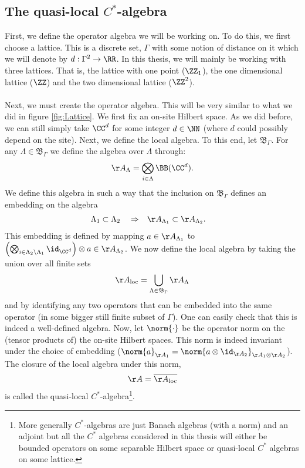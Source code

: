 \subsection{The quasi-local $C^*$-algebra}
First, we define the operator algebra we will be working on. To do this, we first choose a lattice. This is a discrete set, $\Gamma$ with some notion of distance on it which we will denote by $d:\Gamma^2\rightarrow \RR$. In this thesis, we will mainly be working with three lattices. That is, the lattice with one point ($\ZZ_1$), the one dimensional lattice ($\ZZ$) and the two dimensional lattice ($\ZZ^2$).\\\\
Next, we must create the operator algebra. This will be very similar to what we did in figure \ref{fig:Lattice}. We first fix an on-site Hilbert space. As we did before, we can still simply take $\CC^d$ for some integer $d\in\NN$ (where $d$ could possibly depend on the site). Next, we define the local algebra. To this end, let $\mathfrak{B}_{\Gamma}$. For any $\Lambda\in\mathfrak{B}_\Gamma$ we define the algebra over $\Lambda$ through:
\begin{equation}
\AA_{\Lambda}=\bigotimes_{i\in\Lambda}\BB(\CC^d).
\end{equation}
We define this algebra in such a way that the inclusion on $\mathfrak{B}_\Gamma$ defines an embedding on the algebra
\begin{align}
\Lambda_1&\subset\Lambda_2&&\Rightarrow&\AA_{\Lambda_1}&\subset\AA_{\Lambda_2}.
\end{align}
This embedding is defined by mapping $a\in\AA_{\Lambda_1}$ to $\left(\bigotimes_{i\in\Lambda_2\backslash\Lambda_1}\id_{\CC^d}\right)\otimes a\in \AA_{\Lambda_2}$. We now define the local algebra by taking the union over all finite sets
\begin{equation}
\AA_{\text{loc}}=\bigcup_{\Lambda\in\mathfrak{B}_\Gamma}\AA_\Lambda
\end{equation}
and by identifying any two operators that can be embedded into the same operator (in some bigger still finite subset of $\Gamma$). One can easily check that this is indeed a well-defined algebra. Now, let $\norm{\cdot}$ be the operator norm on the (tensor products of) the on-site Hilbert spaces. This norm is indeed invariant under the choice of embedding ($\norm{a}_{\AA_1}=\norm{a\otimes\id_{\AA_2}}_{\AA_1\otimes\AA_2}$). The closure of the local algebra under this norm,
\begin{equation}
\AA=\overline{\AA_{\text{loc}}}
\end{equation}
is called the quasi-local $C^*$-algebra\footnote{More generally $C^*$-algebras are just Banach algebras (with a norm) and an adjoint but all the $C^*$ algebras considered in this thesis will either be bounded operators on some separable Hilbert space or quasi-local $C^*$ algebras on some lattice.}.
